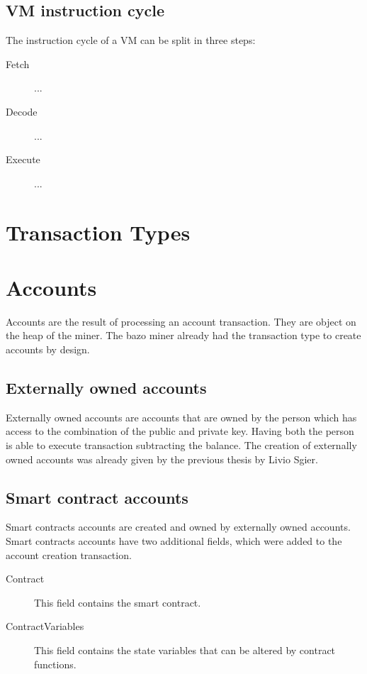 \subsection{VM instruction cycle}
The instruction cycle of a VM can be split in three steps:
\begin{description}
  \item[Fetch] ...
  \item[Decode] ...
  \item[Execute] ...
\end{description}


\section{Transaction Types} \label{transactionTypes}


\section{Accounts}
Accounts are the result of processing an account transaction. They are object on the heap of the miner. The bazo miner already had the transaction type to create accounts by design.

\subsection{Externally owned accounts}
Externally owned accounts are accounts that are owned by the person which has access to the combination of the public and private key. Having both the person is able to execute transaction subtracting the balance. The creation of externally owned accounts was already given by the previous thesis by Livio Sgier.

\subsection{Smart contract accounts}
Smart contracts accounts are created and owned by externally owned accounts. Smart contracts accounts have two additional fields, which were added to the account creation transaction.

\begin{description}
  \item[Contract] This field contains the smart contract.
  \item[ContractVariables] This field contains the state variables that can be altered by contract functions.
\end{description}

